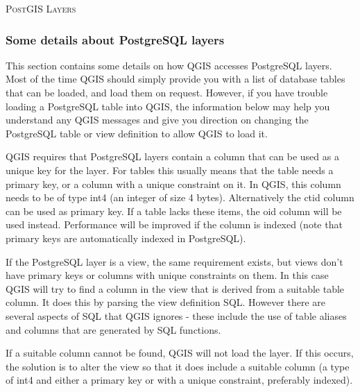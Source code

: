\begin{Tip}\caption{\textsc{PostGIS Layers}}
\end{Tip}

\subsubsection{Some details about PostgreSQL
layers}\label{sec:postgis_details}

This section contains some details on how QGIS accesses PostgreSQL
layers. Most of the time QGIS should simply provide you with a list of
database tables that can be loaded, and load them on request. However,
if you have trouble loading a PostgreSQL table into QGIS, the information
below may help you understand any QGIS messages and give you direction on
changing the PostgreSQL table or view definition to allow QGIS to load it.

QGIS requires that PostgreSQL layers contain a column that can be
used as a unique key for the layer. For tables this usually means
that the table needs a primary key, or a column with a unique
constraint on it. In QGIS, this column needs to be of
type int4 (an integer of size 4 bytes). Alternatively the ctid column can be used as primary key. 
If a table lacks these items,
the oid column will be used instead. Performance will be improved if the
column is indexed (note that primary keys are automatically indexed in
PostgreSQL). 

If the PostgreSQL layer is a view, the same requirement exists, but
views don't have primary keys or columns with unique constraints on
them. In this case QGIS will try to find a column in the view that is
derived from a suitable table column. It does this by parsing the view
definition SQL. However there are several aspects of SQL that QGIS ignores
- these include the use of table aliases and columns that are generated by
SQL functions.

If a suitable column cannot be found, QGIS will not load the layer. If this
occurs, the solution is to alter the view so that it does include a suitable
column (a type of int4 and either a primary key or with a unique constraint,
preferably indexed).

